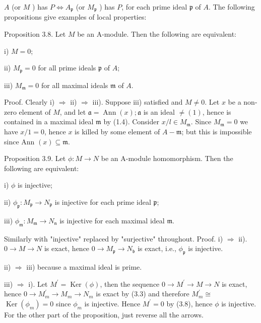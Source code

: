 \documentclass{standalone}
\theoremstyle{definition}
\theoremstyle{remark}
\begin{document}
$A$ (or $M$ ) has $P \Leftrightarrow A_{\mathfrak{p}}$ (or $M_{\mathfrak{p}}$ ) has $P$, for each prime ideal $\mathfrak{p}$ of $A$. The following propositions give examples of local properties:

Proposition 3.8. Let $M$ be an A-module. Then the following are equivalent:

i) $M=0$;

ii) $M_{\mathfrak{p}}=0$ for all prime ideals $\mathfrak{p}$ of $A$;

iii) $M_{\mathfrak{m}}=0$ for all maximal ideals $\mathfrak{m}$ of $A$.

Proof. Clearly i) $\Rightarrow$ ii) $\Rightarrow$ iii). Suppose iii) satisfied and $M \neq 0$. Let $x$ be a non-zero element of $M$, and let $\mathfrak{a}=\operatorname{Ann}(x) ; \mathfrak{a}$ is an ideal $\neq(1)$, hence is contained in a maximal ideal $\mathfrak{m}$ by (1.4). Consider $x / l \in M_{\mathfrak{m}}$. Since $M_{\mathfrak{m}}=0$ we have $x / 1=0$, hence $x$ is killed by some element of $A-\mathfrak{m}$; but this is impossible since Ann $(x) \subseteq \mathfrak{m}$.

Proposition 3.9. Let $\phi: M \rightarrow N$ be an A-module homomorphism. Then the following are equivalent:

i) $\phi$ is injective;

ii) $\phi_{\mathfrak{p}}: M_{\mathfrak{p}} \rightarrow N_{\mathfrak{p}}$ is injective for each prime ideal $\mathfrak{p}$;

iii) $\phi_{\mathfrak{m}}: M_{\mathfrak{m}} \rightarrow N_{\mathfrak{n}}$ is injective for each maximal ideal $\mathfrak{m}$.

Similarly with "injective" replaced by "surjective" throughout. Proof. i) $\Rightarrow$ ii). $0 \rightarrow M \rightarrow N$ is exact, hence $0 \rightarrow M_{\mathfrak{p}} \rightarrow N_{\mathfrak{b}}$ is exact, i.e., $\phi_{\mathfrak{p}}$ is injective.

ii) $\Rightarrow$ iii) because a maximal ideal is prime.

iii) $\Rightarrow$ i). Let $M^{\prime}=\operatorname{Ker}(\phi)$, then the sequence $0 \rightarrow M^{\prime} \rightarrow M \rightarrow N$ is exact, hence $0 \rightarrow M_{m}^{\prime} \rightarrow M_{m} \rightarrow N_{m}$ is exact by (3.3) and therefore $M_{m}^{\prime} \cong$ $\operatorname{Ker}\left(\phi_{m}\right)=0$ since $\phi_{m}$ is injective. Hence $M^{\prime}=0$ by (3.8), hence $\phi$ is injective. For the other part of the proposition, just reverse all the arrows.
\end{document}
